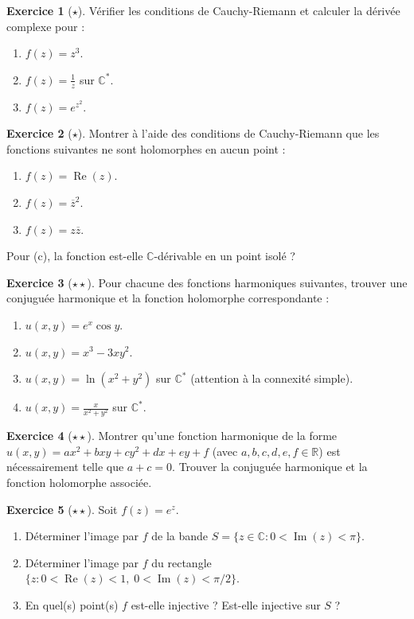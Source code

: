 \documentclass[12pt,a4paper,openany]{book}
\theoremstyle{definition}
\newtheorem{exercice}{Exercice}[chapter]
\theoremstyle{plain}
\theoremstyle{remark}
\newcommand{\C}{\mathbb{C}}
\newcommand{\R}{\mathbb{R}}
\DeclareMathOperator{\re}{Re}
\DeclareMathOperator{\im}{Im}
\newcommand{\conj}[1]{\overline{#1}}
\begin{document}
\begin{exercice}[$\star$]\label{exo:CR-simple}
Vérifier les conditions de Cauchy-Riemann et calculer la dérivée complexe pour :
\begin{enumerate}[label=(\alph*)]
  \item $f(z) = z^3$.
  \item $f(z) = \frac{1}{z}$ sur $\C^*$.
  \item $f(z) = e^{z^2}$.
\end{enumerate}
\end{exercice}

\begin{exercice}[$\star$]\label{exo:non-holomorphe-CR}
Montrer à l'aide des conditions de Cauchy-Riemann que les fonctions suivantes ne sont holomorphes en aucun point :
\begin{enumerate}[label=(\alph*)]
  \item $f(z) = \re(z)$.
  \item $f(z) = \conj{z}^2$.
  \item $f(z) = z\conj{z}$.
\end{enumerate}
Pour (c), la fonction est-elle $\C$-dérivable en un point isolé ?
\end{exercice}

\begin{exercice}[$\star\star$]\label{exo:conjuguee-harmonique-construction}
Pour chacune des fonctions harmoniques suivantes, trouver une conjuguée harmonique et la fonction holomorphe correspondante :
\begin{enumerate}[label=(\alph*)]
  \item $u(x,y) = e^x\cos y$.
  \item $u(x,y) = x^3 - 3xy^2$.
  \item $u(x,y) = \ln(x^2 + y^2)$ sur $\C^*$ (attention à la connexité simple).
  \item $u(x,y) = \frac{x}{x^2+y^2}$ sur $\C^*$.
\end{enumerate}
\end{exercice}

\begin{exercice}[$\star\star$]\label{exo:harmonique-verification}
Montrer qu'une fonction harmonique de la forme $u(x,y) = ax^2 + bxy + cy^2 + dx + ey + f$ (avec $a,b,c,d,e,f \in \R$) est nécessairement telle que $a + c = 0$. Trouver la conjuguée harmonique et la fonction holomorphe associée.
\end{exercice}

\begin{exercice}[$\star\star$]\label{exo:conformite-exp}
Soit $f(z) = e^z$.
\begin{enumerate}[label=(\alph*)]
  \item Déterminer l'image par $f$ de la bande $S = \{z \in \C : 0 < \im(z) < \pi\}$.
  \item Déterminer l'image par $f$ du rectangle $\{z : 0 < \re(z) < 1,\; 0 < \im(z) < \pi/2\}$.
  \item En quel(s) point(s) $f$ est-elle injective ? Est-elle injective sur $S$ ?
\end{enumerate}
\end{exercice}
\end{document}

